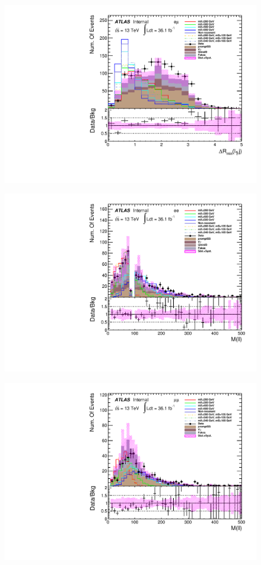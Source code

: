 \begin{figure}[h]
\begin{minipage}[t]{0.33\linewidth}
 \includegraphics[width=1.0\textwidth]{fig/dataMC_low_Njet_CR/mindR_l1j_emu.pdf}\label{fig:dataMC_low_Njet_CR:mindRl1j_emu.pdf}
 \end{minipage}
 \begin{minipage}[t]{0.33\linewidth}
 \centering
 \includegraphics[width=1.0\textwidth]{fig/dataMC_low_Njet_CR/m_ll_ee.pdf}
 \label{fig:dataMC_low_Njet_CR:m_ll_ee.pdf}
 \end{minipage}
 \begin{minipage}[t]{0.33\linewidth}
 \centering
 \includegraphics[width=1.0\textwidth]{fig/dataMC_low_Njet_CR/m_ll_mumu.pdf}

\end{minipage}
\end{figure}

